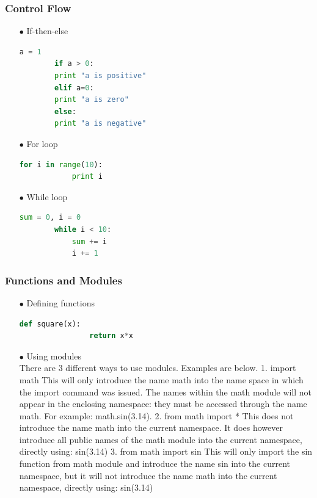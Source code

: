 
\begin{frame}[fragile]
  \MyLogo
  \frametitle{Control Flow}  
\small

\begin{itemize}
	\item[$\bullet$] If-then-else
	\begin{lstlisting}[language=python]
		a = 1
		if a > 0:
		print "a is positive"
		elif a=0:
		print "a is zero"
		else:
		print "a is negative"
	\end{lstlisting}			
	\item[$\bullet$] For loop
	\begin{lstlisting}[language=python]
		for i in range(10):
			print i
	\end{lstlisting}	
	\item[$\bullet$] While loop
	\begin{lstlisting}[language=python]
		sum = 0, i = 0
		while i < 10:
			sum += i
			i += 1
	\end{lstlisting}
\end{itemize}

\end{frame}


\begin{frame}[fragile]
  \MyLogo
  \frametitle{Functions and Modules}  
\small

\begin{itemize}
	\item[$\bullet$] Defining functions 
		\begin{lstlisting}[language=python]
			def square(x):
				return x*x
		\end{lstlisting}		
	\item[$\bullet$] Using modules\\
			There are 3 different ways to use modules. Examples are below.
			1. import math
				This will only introduce the name math into the name space in which the import command was issued. The names within the math module will not appear in the enclosing namespace: they must be accessed through the name math. For example: math.sin(3.14).
			2. from math import *
				This does not introduce the name math into the current namespace. It does however introduce all public names of the math module into the current namespace, directly using: sin(3.14)
			3. from math import sin
				This will only import the sin function from math module and introduce the name sin into the current namespace, but it will not introduce the name math into the current namespace, directly using: sin(3.14)
		
\end{itemize}

\end{frame}
